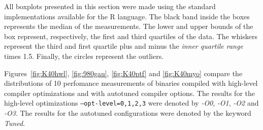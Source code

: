 All boxplots presented in this section were made using the standard
implementations available for the R language.  The black band inside the boxes
represents the median of the measurements. The lower and upper bounds of the
box represent, respectively, the first and third quartiles of the data. The
whiskers represent the third and first quartile plus and minus the \emph{inner
quartile range} times 1.5. Finally, the circles represent the outliers.

Figures~\ref{fig:K40hwl}, \ref{fig:980gau}, \ref{fig:K40ptf} and
\ref{fig:K40myo} compare the distributions of 10 perfomance measurements of
binaries compiled with high-level compiler optimizations and with autotuned
compiler options. The results for the high-level optimizations
\texttt{--opt-level=0,1,2,3} were denoted by \emph{-O0}, \emph{-O1}, \emph{-O2}
and \emph{-O3}.  The results for the autotuned configurations were denoted by
the keyword \emph{Tuned}.


